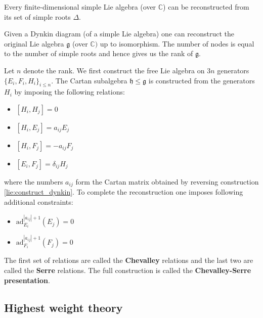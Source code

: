         \begin{theorem}
        	Every finite-dimensional simple Lie algebra (over $\mathbb{C}$) can be reconstructed from its set of simple roots $\Delta$.
        \end{theorem}
        \begin{construct}\label{lie:reconstruction}
        	Given a Dynkin diagram (of a simple Lie algebra) one can reconstruct the original Lie algebra $\mathfrak{g}$ (over $\mathbb{C})$ up to isomorphism. The number of nodes is equal to the number of simple roots and hence gives us the rank of $\mathfrak{g}$.
        	
        	Let $n$ denote the rank. We first construct the free Lie algebra on $3n$ generators $\{E_i, F_i, H_i\}_{i\leq n}$. The Cartan subalgebra $\mathfrak{h}\leq\mathfrak{g}$ is constructed from the generators $H_i$ by imposing the following relations:
        	\begin{itemize}
        		\item $[H_i, H_j] = 0$
        		\item $[H_i, E_j] = a_{ij}E_j$
        		\item $[H_i, F_j] = -a_{ij}F_j$
        		\item $[E_i, F_j] = \delta_{ij}H_j$
        	\end{itemize}
        	where the numbers $a_{ij}$ form the Cartan matrix obtained by reversing construction \ref{lie:construct_dynkin}. To complete the reconstruction one imposes following additional constraints:
        	\begin{itemize}
        		\item $\text{ad}_{E_i}^{|a_{ij}|+1}(E_j) = 0$
        		\item $\text{ad}_{F_i}^{|a_{ij}|+1}(F_j) = 0$
        	\end{itemize}
        	The first set of relations are called the \textbf{Chevalley} relations and the last two are called the \textbf{Serre} relations. The full construction is called the \textbf{Chevalley-Serre presentation}.
        \end{construct}

\subsection{Highest weight theory}

